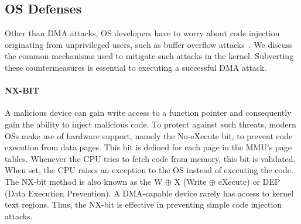 
        



\subsection{OS Defenses}

Other than DMA attacks, OS developers have to worry about code injection originating from unprivileged users, such as buffer overflow attacks~\cite{nx, kalsr}.
We discuss the common mechanisms used to mitigate such attacks in the kernel. Subverting these countermeasures is essential to executing a successful DMA attack.

\paragraph{NX-BIT}\label{sec:nx-bit}

A malicious device can gain write access to a function pointer and consequently gain the ability to inject malicious code. 
To protect against such threats, modern OSs make use of hardware support, namely the No-eXecute bit, to prevent code execution from data pages. This bit is defined for each page in the MMU’s page tables. Whenever the CPU tries to fetch code from memory, this bit is validated. When set, the CPU raises an exception to the OS instead of executing the code. The NX-bit method is also known as the W $\oplus$ X (Write $\oplus$ eXecute) or DEP (Data Execution Prevention). 
A DMA-capable device rarely has access to kernel text regions. Thus, the NX-bit is effective in preventing simple code injection attacks.

